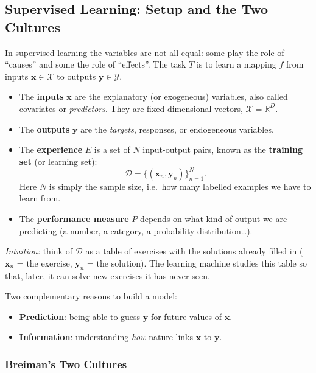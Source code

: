 \subsection{Supervised Learning: Setup and the Two Cultures}\label{sec:rl-prolusion-supervised-setup}

In supervised learning the variables are not all equal: some play the role of ``causes'' and some the role of ``effects''. The task $T$ is to learn a mapping $f$ from inputs $\mathbf{x} \in \mathcal{X}$ to outputs $\mathbf{y} \in \mathcal{Y}$.

\begin{itemize}
  \item The \textbf{inputs} $\mathbf{x}$ are the explanatory (or exogeneous) variables, also called covariates or \textit{predictors}. They are fixed-dimensional vectors, $\mathcal{X} = \mathbb{R}^D$.
  \item The \textbf{outputs} $\mathbf{y}$ are the \textit{targets}, responses, or endogeneous variables.
  \item The \textbf{experience} $E$ is a set of $N$ input-output pairs, known as the \textbf{training set} (or learning set):
  \[
    \mathcal{D} = \{(\mathbf{x}_n, \mathbf{y}_n)\}_{n=1}^{N}.
  \]
  Here $N$ is simply the sample size, i.e.\ how many labelled examples we have to learn from.
  \item The \textbf{performance measure} $P$ depends on what kind of output we are predicting (a number, a category, a probability distribution\dots).
\end{itemize}

\textit{Intuition:} think of $\mathcal{D}$ as a table of exercises with the solutions already filled in ($\mathbf{x}_n$ = the exercise, $\mathbf{y}_n$ = the solution). The learning machine studies this table so that, later, it can solve new exercises it has never seen.

Two complementary reasons to build a model:
\begin{itemize}
  \item \textbf{Prediction}: being able to guess $\mathbf{y}$ for future values of $\mathbf{x}$.
  \item \textbf{Information}: understanding \emph{how} nature links $\mathbf{x}$ to $\mathbf{y}$.
\end{itemize}

\subsubsection{Breiman's Two Cultures}


